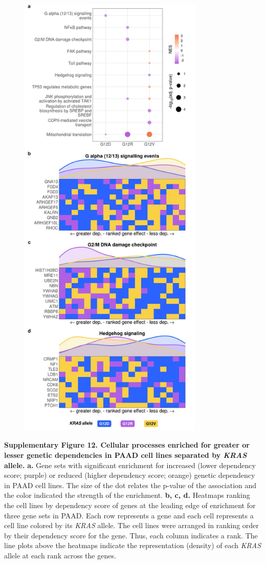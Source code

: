 \documentclass[english, 10pt, letterpaper]{article}
\newcommand{\KRAS}{\emph{KRAS}}
\begin{document}
\begin{figure}[h!]
\centering
\includegraphics[width=88mm]{figures/Supp_Fig_12.jpeg}
\label{sfig:paad-dependency-gsea}
\end{figure}

\newpage
\noindent \textbf{Supplementary Figure 12. Cellular processes enriched for greater or lesser genetic dependencies in PAAD cell lines separated by \KRAS{} allele.}
\textbf{a.} Gene sets with significant enrichment for increased (lower dependency score; purple) or reduced (higher dependency score; orange) genetic dependency in PAAD cell lines. The size of the dot relates the p-value of the association and the color indicated the strength of the enrichment.
\textbf{b, c, d.} Heatmaps ranking the cell lines by dependency score of genes at the leading edge of enrichment for three gene sets in PAAD. Each row represents a gene and each cell represents a cell line colored by its \KRAS{} allele. The cell lines were arranged in ranking order by their dependency score for the gene. Thus, each column indicates a rank. The line plots above the heatmaps indicate the representation (density) of each \KRAS{} allele at each rank across the genes.
\newpage
\end{document}
